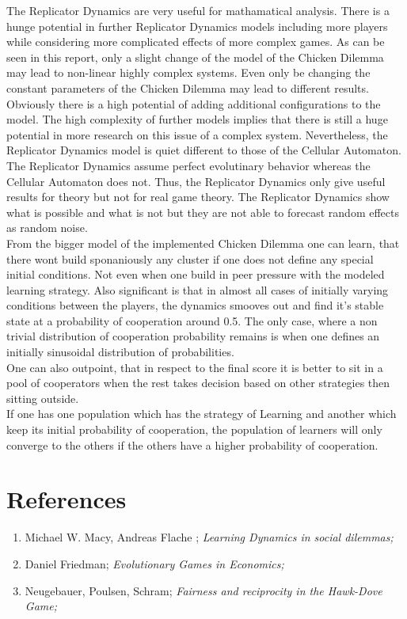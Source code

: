 \documentclass[11pt]{article}
\begin{document}
The Replicator Dynamics are very useful for mathamatical analysis. There is a hunge potential in further Replicator Dynamics models including more players while considering more complicated effects of more complex games. As can be seen in this report, only a slight change of the model of the Chicken Dilemma may lead to non-linear highly complex systems. Even only be changing the constant parameters of the Chicken Dilemma may lead to different results. Obviously there is a high potential of adding additional configurations to the model. The high complexity of further models implies that there is still a huge potential in more research on this issue of a complex system.
Nevertheless, the Replicator Dynamics model is quiet different to those of the Cellular Automaton. The Replicator Dynamics assume perfect evolutinary behavior whereas the Cellular Automaton does not. Thus, the Replicator Dynamics only give useful results for theory but not for real game theory. The Replicator Dynamics show what is possible and what is not but they are not able to forecast random effects as random noise. 
\\From the bigger model of the implemented Chicken Dilemma one can learn, that there wont build sponaniously any cluster if one does not define any special initial conditions. Not even when one build in peer pressure with the modeled learning strategy. Also significant is that in almost all cases of initially varying conditions between the players, the dynamics smooves out and find it's stable state at a probability of cooperation around 0.5. The only case, where a non trivial distribution of cooperation probability remains is when one defines an initially sinusoidal distribution of probabilities.
\\One can also outpoint, that in respect to the final score it is better to sit in a pool of cooperators when the rest takes decision based on other strategies then sitting outside.
\\If one has one population which has the strategy of Learning and another which keep its initial probability of cooperation, the population of learners will only converge to the others if the others have a higher probability of cooperation.



\section{References}

\begin{enumerate}
\item Michael W. Macy, Andreas Flache ; \itshape {Learning Dynamics in social dilemmas};
\item Daniel Friedman; \itshape {Evolutionary Games in Economics};
\item Neugebauer, Poulsen, Schram; \itshape{Fairness and reciprocity in the Hawk-Dove Game};
\end{enumerate}
\end{document}
